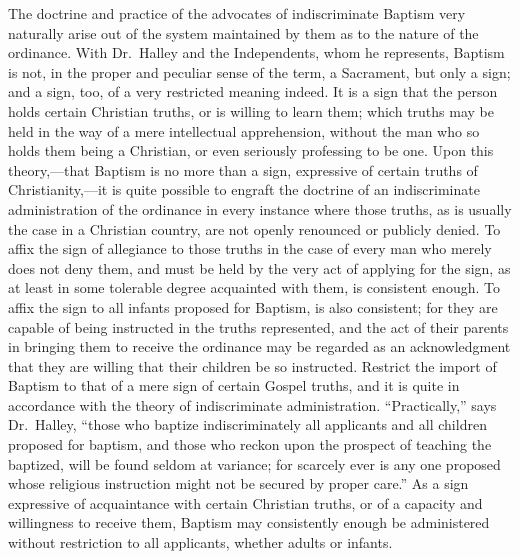 \documentclass[]{book}
\begin{document}
The doctrine and practice of the advocates of indiscriminate Baptism very naturally arise out of the system maintained by them as to the nature of the ordinance. With Dr.~Halley and the Independents, whom he represents, Baptism is not, in the proper and peculiar sense of the term, a Sacrament, but only a sign; and a sign, too, of a very restricted meaning indeed. It is a sign that the person holds certain Christian truths, or is willing to learn them; which truths may be held in the way of a mere intellectual apprehension, without the man who so holds them being a Christian, or even seriously professing to be one. Upon this theory,---that Baptism is no more than a sign, expressive of certain truths of Christianity,---it is quite possible to engraft the doctrine of an indiscriminate administration of the ordinance in every instance where those truths, as is usually the case in a Christian country, are not openly renounced or publicly denied. To affix the sign of allegiance to those truths in the case of every man who merely does not deny them, and must be held by the very act of applying for the sign, as at least in some tolerable degree acquainted with them, is consistent enough. To affix the sign to all infants proposed for Baptism, is also consistent; for they are capable of being instructed in the truths represented, and the act of their parents in bringing them to receive the ordinance may be regarded as an acknowledgment that they are willing that their children be so instructed. Restrict the import of Baptism to that of a mere sign of certain Gospel truths, and it is quite in accordance with the theory of indiscriminate administration. ``Practically,'' says Dr.~Halley, ``those who baptize indiscriminately all applicants and all children proposed for baptism, and those who reckon upon the prospect of teaching the baptized, will be found seldom at variance; for scarcely ever is any one proposed whose religious instruction might not be secured by proper care.'' As a sign expressive of acquaintance with certain Christian truths, or of a capacity and willingness to receive them, Baptism may consistently enough be administered without restriction to all applicants, whether adults or infants.
\end{document}
